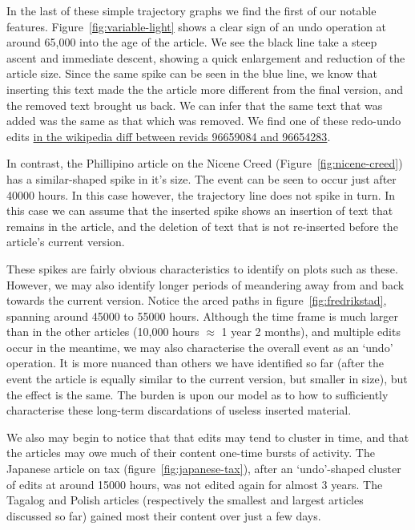 In the last of these simple trajectory graphs we find the first of our
notable features. Figure~\ref{fig:variable-light} shows a clear sign
of an undo operation at around 65,000 into the age of the article. We
see the black line take a steep ascent and immediate descent, showing
a quick enlargement and reduction of the article size. Since the same
spike can be seen in the blue line, we know that inserting this text
made the the article more different from the final version, and the
removed text brought us back. We can infer that the same text that was
added was the same as that which was removed. We find one of these
redo-undo edits
\href{http://fr.wikipedia.org/w/index.php?title=Th\%C3\%A9ories\_d\%27une\_vitesse\_de\_lumi\%C3\%A8re\_variable&diff=96659084&oldid=96654283}{in
  the wikipedia diff between revids 96659084 and 96654283}.

In contrast, the Phillipino article on the Nicene Creed
(Figure~\ref{fig:nicene-creed}) has a similar-shaped spike in it's
size. The event can be seen to occur just after 40000 hours. In this
case however, the trajectory line does not spike in turn. In this case
we can assume that the inserted spike shows an insertion of text that
remains in the article, and the deletion of text that is not
re-inserted before the article's current version.

These spikes are fairly obvious characteristics to identify on plots
such as these. However, we may also identify longer periods of
meandering away from and back towards the current version. Notice the
arced paths in figure~\ref{fig:fredrikstad}, spanning around 45000 to
55000 hours. Although the time frame is much larger than in the other
articles (10,000 hours $\approx$ 1 year 2 months), and multiple edits
occur in the meantime, we may also characterise the overall event as
an `undo' operation. It is more nuanced than others we have identified
so far (after the event the article is equally similar to the current
version, but smaller in size), but the effect is the same. The burden
is upon our model as to how to sufficiently characterise these
long-term discardations of useless inserted material.

We also may begin to notice that that edits may tend to cluster in
time, and that the articles may owe much of their content one-time
bursts of activity. The Japanese article on tax
(figure~\ref{fig:japanese-tax}), after an `undo'-shaped cluster of
edits at around 15000 hours, was not edited again for almost 3
years. The Tagalog and Polish articles (respectively the smallest and
largest articles discussed so far) gained most their content over just
a few days. 

